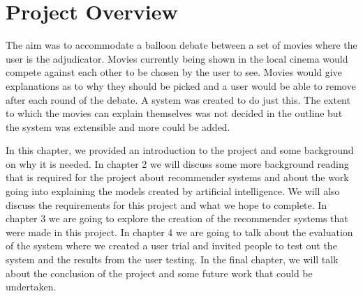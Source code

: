     \section{Project Overview}
        The aim was to accommodate a balloon debate between a set of movies where the user is the adjudicator. Movies currently being shown in the local cinema would compete against each other to be chosen by the user to see. Movies would give explanations as to why they should be picked and a user would be able to remove after each round of the debate. A system was created to do just this. The extent to which the movies can explain themselves was not decided in the outline but the system was extensible and more could be added. 
        
        In this chapter, we provided an introduction to the project and some background on why it is needed. In chapter 2 we will discuss some more background reading that is required for the project about recommender systems and about the work going into explaining the models created by artificial intelligence. We will also discuss the requirements for this project and what we hope to complete. In chapter 3 we are going to explore the creation of the recommender systems that were made in this project. In chapter 4 we are going to talk about the evaluation of the system where we created a user trial and invited people to test out the system and the results from the user testing. In the final chapter, we will talk about the conclusion of the project and some future work that could be undertaken. 
